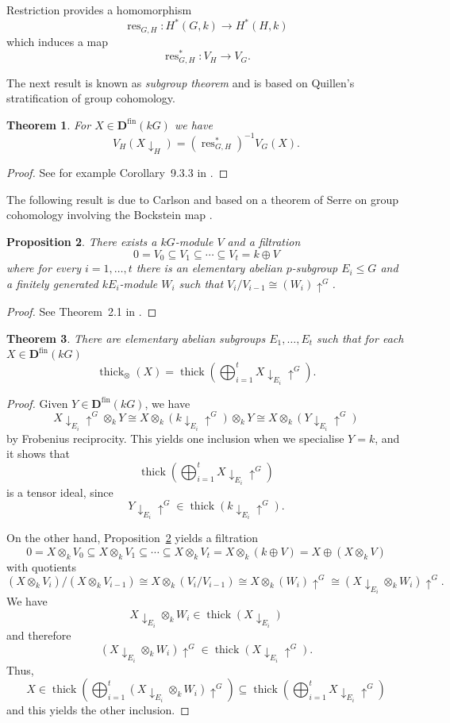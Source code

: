 \documentclass{amsart}[a4]
\newtheorem{theorem}{Theorem}[section]
\newtheorem{proposition}[theorem]{Proposition}
\theoremstyle{definition}
\theoremstyle{remark}
\numberwithin{equation}{section}
\newcommand{\res}{\operatorname{res}}
\newcommand{\thick}{\operatorname{thick}}
\newcommand{\da}{{\downarrow}}
\newcommand{\lto}{\longrightarrow}
\newcommand{\ua}{{\uparrow}}
\newcommand{\fin}{\mathrm{fin}}
\newcommand{\bfD}{\mathbf D}
\begin{document}
Restriction provides a homomorphism
\[\res_{G,H}\colon H^*(G,k)\lto H^*(H,k)\]
which induces a map
\[\res_{G,H}^*\colon V_H\lto V_G.\]

The next result is known as \emph{subgroup theorem} and is based on
Quillen's stratification of group cohomology.
 
\begin{theorem}\label{th:subgroup-res-thm}
  For  $X\in\bfD^\fin(kG)$ we have
  \[V_H(X\da_H)=(\res^*_{G,H})^{-1}V_G(X).\]
\end{theorem}
\begin{proof}
See  for example Corollary~9.3.3 in \cite{Evens:1991a}.
\end{proof}

The following result is due to Carlson and based on a theorem of Serre
on group cohomology involving the Bockstein map \cite{Serre:1965a}.

\begin{proposition}\label{pr:filtration-elem-abelian}
  There exists a $kG$-module $V$ and a filtration
\[0=V_0\subseteq V_1\subseteq\cdots \subseteq V_t=k\oplus V\]
where for every $i = 1,\ldots,t$ there is an elementary abelian
$p$-subgroup $E_i\le G$ and
a finitely generated $kE_i$-module $W_i$ such that $V_i/V_{i-1}\cong (W_i)\ua^G$.
\end{proposition}
\begin{proof}
  See Theorem~2.1 in \cite{Carlson:2000c}.
\end{proof}

\begin{theorem}\label{th:filtration-elem-abelian}
  There are elementary abelian subgroups $E_1,\ldots,E_t$ such that
  for each $X\in \bfD^\fin(kG)$
  \[\thick_\otimes(X)=\thick\left(\bigoplus_{i=1}^t X\da_{E_i}\ua^G\right).\]
\end{theorem}
\begin{proof}
  Given $Y\in \bfD^\fin(kG)$, we have
  \[X\da_{E_i}\ua^G\otimes_k Y\cong X\otimes_k
    (k\da_{E_i}\ua^G)\otimes_k Y\cong X\otimes_k (Y\da_{E_i}\ua^G)\]
  by Frobenius reciprocity. This yields one inclusion when we
  specialise $Y=k$, and it shows that
  \[\thick\left(\bigoplus_{i=1}^t X\da_{E_i}\ua^G\right)\] is a tensor
  ideal, since   \[Y\da_{E_i}\ua^G\in\thick(k\da_{E_i}\ua^G).\]

  On the other
  hand, Proposition~\ref{pr:filtration-elem-abelian} yields a
  filtration
\[0=X\otimes_k V_0\subseteq X\otimes_k V_1\subseteq\cdots \subseteq
  X\otimes_k V_t=X\otimes_k (k\oplus V)=X\oplus (X\otimes_k V)\] with quotients
\[(X\otimes_k V_i)/(X\otimes_k V_{i-1}) \cong X\otimes_k (V_i/V_{i-1})\cong
  X \otimes_k(W_i)\ua^G\cong (X\da_{E_i}\otimes_k W_i)\ua^G.
\]
We have \[X\da_{E_i}\otimes_k W_i\in\thick(X\da_{E_i})\]
and therefore
\[(X\da_{E_i}\otimes_k W_i)\ua^G\in\thick(X\da_{E_i}\ua^G).\] Thus,
\[X\in \thick\left(\bigoplus_{i=1}^t (X\da_{E_i}\otimes_k W_i)\ua^G
  \right)\subseteq \thick\left(\bigoplus_{i=1}^t X\da_{E_i}\ua^G
  \right)\]
and this yields the other inclusion.
\end{proof}
\end{document}
